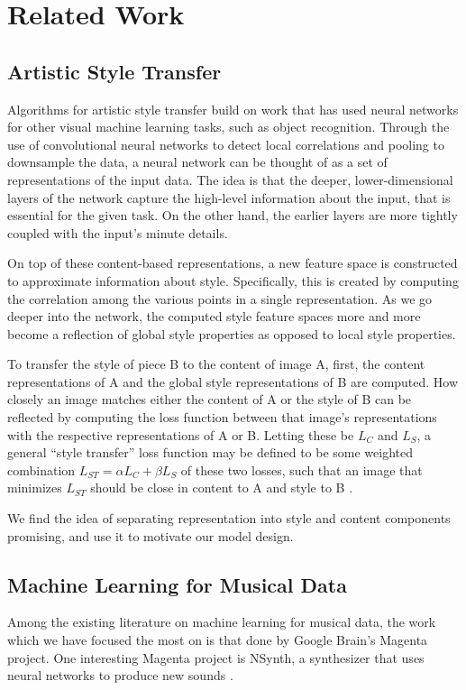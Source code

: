 \documentclass{article}
\begin{document}
\section{Related Work}
\subsection{Artistic Style Transfer}
Algorithms for artistic style transfer build on work that has used neural networks for other visual machine learning tasks, such as object recognition.
Through the use of convolutional neural networks to detect local correlations and pooling to downsample the data, a neural network can be thought of as a set of representations of the input data.
The idea is that the deeper, lower-dimensional layers of the network capture the high-level information about the input, that is essential for the given task.
On the other hand, the earlier layers are more tightly coupled with the input's minute details.

On top of these content-based representations, a new feature space is constructed to approximate information about style. Specifically, this is created by computing the correlation among the various points in a single representation.
As we go deeper into the network, the computed style feature spaces more and more become a reflection of global style properties as opposed to local style properties.

To transfer the style of piece B to the content of image A, first, the content representations of A and the global style representations of B are computed.
How closely an image matches either the content of A or the style of B can be reflected by computing the loss function between that image's representations with the respective representations of A or B.
Letting these be $L_C$ and $L_S$, a general ``style transfer'' loss function may be defined to be some weighted combination $L_{ST} = \alpha L_C + \beta L_S$ of these two losses, such that an image that minimizes $L_{ST}$ should be close in content to A and style to B \cite{gea15}.

We find the idea of separating representation into style and content components promising, and use it to motivate our model design.

\subsection{Machine Learning for Musical Data}

Among the existing literature on machine learning for musical data, the work which we have focused the most on is that done by Google Brain's Magenta project\cite{magenta}.
One interesting Magenta project is NSynth, a synthesizer that uses neural networks to produce new sounds \cite{nsynth2017}.
\end{document}
